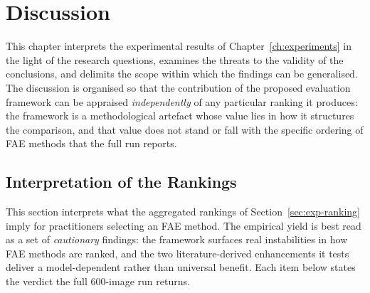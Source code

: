 \chapter{Discussion}
\label{ch:discussion}

This chapter interprets the experimental results of
Chapter~\ref{ch:experiments} in the light of the research questions, examines
the threats to the validity of the conclusions, and delimits the scope within
which the findings can be generalised. The discussion is organised so that the
contribution of the proposed evaluation framework can be appraised
\emph{independently} of any particular ranking it produces: the framework is a
methodological artefact whose value lies in how it structures the comparison,
and that value does not stand or fall with the specific ordering of FAE methods
that the full run reports.

\section{Interpretation of the Rankings}
\label{sec:disc-rankings}

This section interprets what the aggregated rankings of
Section~\ref{sec:exp-ranking} imply for practitioners selecting an FAE method.
The empirical yield is best read as a set of \emph{cautionary} findings: the
framework surfaces real instabilities in how FAE methods are ranked, and the
two literature-derived enhancements it tests deliver a model-dependent rather
than universal benefit. Each item below states the verdict the full 600-image
run returns.

